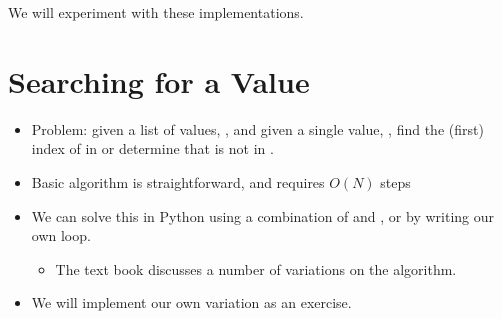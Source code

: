 \documentclass[letterpaper,10pt,english]{sphinxmanual}
\begin{document}
\begin{itemize}
\begin{sphinxVerbatim}[commandchars=\\\{\}]
      
      
        
\end{sphinxVerbatim}

\end{itemize}

We will experiment with these implementations.


\section{Searching for a Value}
\label{\detokenize{lecture_notes/lec20_searching:searching-for-a-value}}\begin{itemize}
\item {} 
Problem: given a list of values, , and given a single value,
, find the (first) index of  in  or determine that
 is not in .

\item {} 
Basic algorithm is straightforward, and requires \(O(N)\) steps

\item {} 
We can solve this in Python using a combination of  and
, or by writing our own loop.
\begin{itemize}
\item {} 
The text book discusses a number of variations on the algorithm.

\end{itemize}

\item {} 
We will implement our own variation as an exercise.

\end{itemize}
\end{document}
